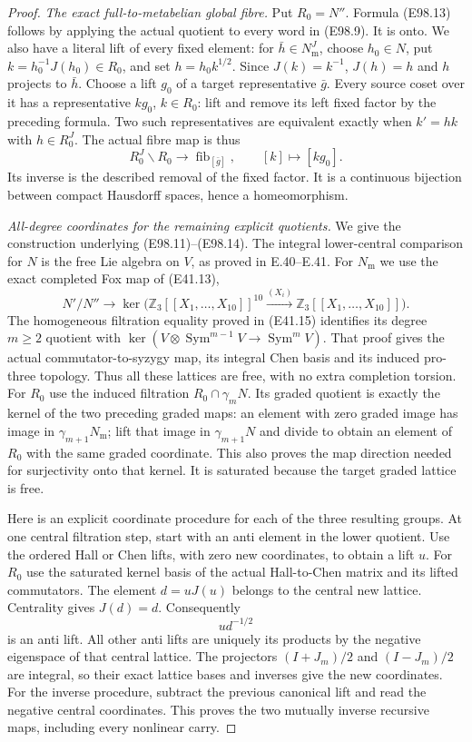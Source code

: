 \begin{proof}
\emph{The exact full-to-metabelian global fibre.}
Put $R_0=N''$. Formula (E98.13) follows by
applying the actual quotient to every word
in (E98.9). It is onto. We also have a
literal lift of every fixed element:
for $\bar h\in N_{\mathrm m}^J$, choose
$h_0\in N$, put $k=h_0^{-1}J(h_0)\in R_0$,
and set $h=h_0k^{1/2}$. Since $J(k)=k^{-1}$,
$J(h)=h$ and $h$ projects to $\bar h$.
Choose a lift $g_0$ of a target representative
$\bar g$. Every source coset over it has
a representative $kg_0$, $k\in R_0$:
lift and remove its left fixed factor by
the preceding formula. Two such representatives
are equivalent exactly when $k'=hk$ with
$h\in R_0^J$. The actual fibre map is thus
\[
              R_0^J\backslash R_0\longrightarrow
                 \operatorname{fib}_{[\bar g]},
                      \qquad[k]\longmapsto[kg_0].
 \tag{E98.28}
\]
Its inverse is the described removal of the
fixed factor. It is a continuous bijection
between compact Hausdorff spaces, hence a
homeomorphism.

\emph{All-degree coordinates for the remaining explicit quotients.}
We give the construction underlying (E98.11)--(E98.14).
The integral lower-central comparison for $N$ is
the free Lie algebra on $V$, as proved in E.40--E.41.
For $N_{\mathrm m}$ we use the exact completed Fox
map of (E41.13),
\[
 N'/N''\longrightarrow
   \ker\bigl(\mathbb Z_3[[X_1,\ldots,X_{10}]]^{10}
                       \xrightarrow{(X_i)}
                    \mathbb Z_3[[X_1,\ldots,X_{10}]]\bigr).
 \tag{E98.29}
\]
The homogeneous filtration equality proved in
(E41.15) identifies its degree $m\ge2$ quotient
with
$\ker(V\otimes\operatorname{Sym}^{m-1}V
                     \to\operatorname{Sym}^{m}V)$.
That proof gives the actual commutator-to-syzygy
map, its integral Chen basis and its induced
pro-three topology. Thus all these lattices
are free, with no extra completion torsion.
For $R_0$ use the induced filtration
$R_0\cap\gamma_mN$. Its graded quotient is
exactly the kernel of the two preceding
graded maps: an element with zero graded
image has image in $\gamma_{m+1}N_{\mathrm m}$;
lift that image in $\gamma_{m+1}N$ and divide
to obtain an element of $R_0$ with the same
graded coordinate. This also proves the
map direction needed for surjectivity onto
that kernel. It is saturated because the
target graded lattice is free.

Here is an explicit coordinate procedure
for each of the three resulting groups.
At one central filtration step, start
with an anti element in the lower quotient.
Use the ordered Hall or Chen lifts, with
zero new coordinates, to obtain a lift $u$.
For $R_0$ use the saturated kernel basis
of the actual Hall-to-Chen matrix and its
lifted commutators. The element
$d=uJ(u)$ belongs to the central new
lattice. Centrality gives $J(d)=d$.
Consequently
\[
                  u d^{-1/2}
 \tag{E98.30}
\]
is an anti lift. All other anti lifts are
uniquely its products by the negative
eigenspace of that central lattice.
The projectors $(I+J_m)/2$ and $(I-J_m)/2$
are integral, so their exact lattice
bases and inverses give the new coordinates.
For the inverse procedure, subtract the
previous canonical lift and read the
negative central coordinates. This proves
the two mutually inverse recursive maps,
including every nonlinear carry.


\end{proof}
